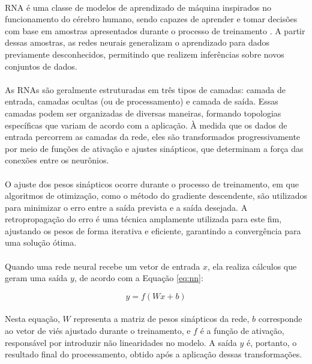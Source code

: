 \paragraph{} \ac{RNA} é uma classe de modelos de aprendizado de máquina inspirados no funcionamento do cérebro humano, sendo capazes de aprender e tomar decisões com base em amostras apresentados durante o processo de treinamento \cite{haykin1998neural}. A partir dessas amostras, as redes neurais generalizam o aprendizado para dados previamente desconhecidos, permitindo que realizem inferências sobre novos conjuntos de dados.

\paragraph{} As \ac{RNA}s são geralmente estruturadas em três tipos de camadas: camada de entrada, camadas ocultas (ou de processamento) e camada de saída. Essas camadas podem ser organizadas de diversas maneiras, formando topologias específicas que variam de acordo com a aplicação. À medida que os dados de entrada percorrem as camadas da rede, eles são transformados progressivamente por meio de funções de ativação e ajustes sinápticos, que determinam a força das conexões entre os neurônios.

\paragraph{} O ajuste dos pesos sinápticos ocorre durante o processo de treinamento, em que algoritmos de otimização, como o método do gradiente descendente, são utilizados para minimizar o erro entre a saída prevista e a saída desejada. A retropropagação do erro é uma técnica amplamente utilizada para este fim, ajustando os pesos de forma iterativa e eficiente, garantindo a convergência para uma solução ótima.

\paragraph{} Quando uma rede neural recebe um vetor de entrada \(x\), ela realiza cálculos que geram uma saída \(y\), de acordo com a Equação \ref{eq:nn}:

\begin{equation}
	y = f(Wx + b)
	\label{eq:nn}
\end{equation}

\paragraph{} Nesta equação, \(W\) representa a matriz de pesos sinápticos da rede, \(b\) corresponde ao vetor de viés ajustado durante o treinamento, e \(f\) é a função de ativação, responsável por introduzir não linearidades no modelo. A saída \(y\) é, portanto, o resultado final do processamento, obtido após a aplicação dessas transformações.

